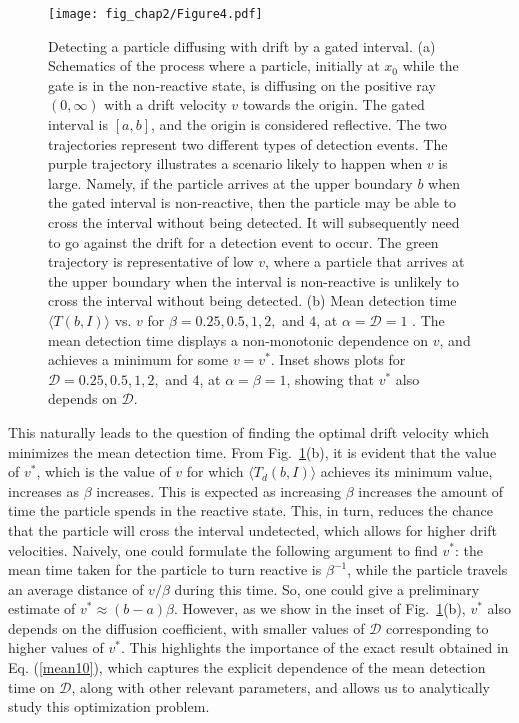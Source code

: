 \begin{figure}[h]
    \centering
    \texttt{[image: fig\_chap2/Figure4.pdf]}
    \caption{Detecting a particle diffusing with drift by a gated interval. (a) Schematics of the process where a particle, initially at $x_0$ while the gate is in the non-reactive state, is diffusing on the positive ray $(0,\infty)$ with a drift velocity $v$ towards the origin. The gated interval is $[a,b]$, and the origin is considered reflective. The two trajectories represent two different types of detection events. The purple trajectory illustrates a scenario likely to happen when $v$ is large. Namely, if the particle arrives at the upper boundary $b$ when the gated interval is non-reactive, then the particle may be able to cross the interval without being detected. It will subsequently need to go against the drift for a detection event to occur. The green trajectory is representative of low $v$, where a particle that arrives at the upper boundary when the interval is non-reactive is unlikely to cross the interval without being detected. (b) Mean detection time $\langle T(b,I) \rangle $ vs. $v$ for $\beta = 0.25, 0.5, 1, 2,$ and $4$, at $\alpha=\mathcal{D}=1$ . The mean detection time displays a non-monotonic dependence on $v$, and achieves a minimum for some $v=v^*$. Inset shows plots for $\mathcal{D}=0.25, 0.5, 1, 2,$ and $4$, at $\alpha=\beta=1$, showing that $v^*$ also depends on $\mathcal{D}$.}
    \label{fig:schematic_bounded}
\end{figure}

This naturally leads to the question of finding the optimal drift velocity which minimizes the mean detection time. From Fig.~\ref{fig:schematic_bounded}(b), it is evident that the value of $v^*$, which is the value of $v$ for which $\langle T_d(b,I) \rangle$ achieves its minimum value, increases as $\beta$ increases. This is expected as increasing $\beta$ increases the amount of time the particle spends in the reactive state. This, in turn, reduces the chance that the particle will cross the interval undetected, which allows for higher drift velocities. Naively, one could formulate the following argument to find $v^*$: the mean time taken for the particle to turn reactive is $\beta^{-1}$, while the particle travels an average distance of $v/\beta$ during this time. So, one could give a preliminary estimate of $v^* \approx (b-a)\beta$. However, as we show in the inset of Fig.~\ref{fig:schematic_bounded}(b), $v^*$ also depends on the diffusion coefficient, with smaller values of $\mathcal{D}$ corresponding to higher values of $v^*$. This highlights the importance of the exact result obtained in Eq. (\ref{mean10}), which captures the explicit dependence of the mean detection time on $\mathcal{D}$, along with other relevant parameters, and allows us to analytically study this optimization problem. 


